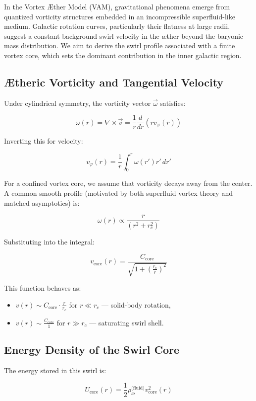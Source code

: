 \documentclass[12pt]{article}
\begin{document}
In the Vortex \AE{}ther Model (VAM), gravitational phenomena emerge from quantized vorticity structures embedded in an incompressible superfluid-like medium. Galactic rotation curves, particularly their flatness at large radii, suggest a constant background swirl velocity in the æther beyond the baryonic mass distribution. We aim to derive the swirl profile associated with a finite vortex core, which sets the dominant contribution in the inner galactic region.

\subsection{Ætheric Vorticity and Tangential Velocity}

Under cylindrical symmetry, the vorticity vector \( \vec{\omega} \) satisfies:

\[
\omega(r) = \nabla \times \vec{v} = \frac{1}{r} \frac{d}{dr} \left( r v_\varphi(r) \right)
\]

Inverting this for velocity:

\[
v_\varphi(r) = \frac{1}{r} \int_0^r \omega(r') r' \, dr'
\]

For a confined vortex core, we assume that vorticity decays away from the center. A common smooth profile (motivated by both superfluid vortex theory and matched asymptotics) is:

\[
\omega(r) \propto \frac{r}{(r^2 + r_c^2)}
\]

Substituting into the integral:

\[
v_\text{core}(r) = \frac{C_{\text{core}}}{\sqrt{1 + \left( \frac{r_c}{r} \right)^2 }}
\]

This function behaves as:
\begin{itemize}
    \item \( v(r) \sim C_{\text{core}} \cdot \frac{r}{r_c} \) for \( r \ll r_c \) — solid-body rotation,
    \item \( v(r) \sim \frac{C_{\text{core}}}{1} \) for \( r \gg r_c \) — saturating swirl shell.
\end{itemize}

\subsection{Energy Density of the Swirl Core}

The energy stored in this swirl is:

\[
U_{\text{core}}(r) = \frac{1}{2} \rho_{\text{\ae}}^{\text{(fluid)}} v_\text{core}^2(r)
\]
\end{document}
